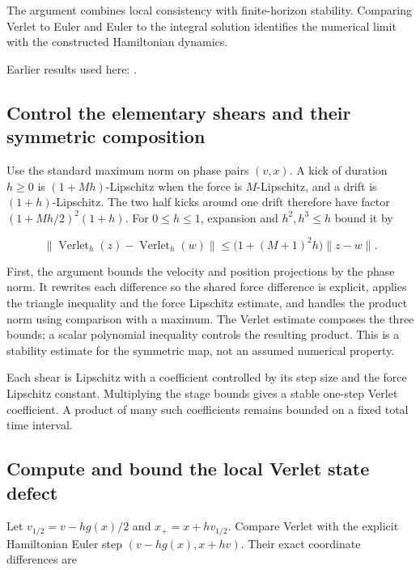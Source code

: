 \documentclass[11pt,a4paper]{report}
\begin{document}
The argument combines local consistency with finite-horizon stability. Comparing Verlet to Euler and Euler to the integral solution identifies the numerical limit with the constructed Hamiltonian dynamics.



Earlier results used here: \cite[Section~3.16]{LangevinLean2026ULASC}.
\subsection{\texorpdfstring{Control the elementary shears and their symmetric composition}{Control the elementary shears and their symmetric composition}}
\label{report-step-KineticLangevin-HamiltonianConvergence-lean-1}


Use the standard maximum norm on phase pairs \((v,x)\). A kick of duration \(h\ge0\) is \((1+Mh)\)-Lipschitz when the force is \(M\)-Lipschitz, and a drift is \((1+h)\)-Lipschitz. The two half kicks around one drift therefore have factor \((1+Mh/2)^2(1+h)\). For \(0\le h\le1\), expansion and \(h^2,h^3\le h\) bound it by

\[\|\operatorname{Verlet}_h(z)-\operatorname{Verlet}_h(w)\|\le\bigl(1+(M+1)^2h\bigr)\|z-w\|.\]

First, the argument bounds the velocity and position projections by the phase norm. It rewrites each difference so the shared force difference is explicit, applies the triangle inequality and the force Lipschitz estimate, and handles the product norm using comparison with a maximum. The Verlet estimate composes the three bounds; a scalar polynomial inequality controls the resulting product. This is a stability estimate for the symmetric map, not an assumed numerical property.



Each shear is Lipschitz with a coefficient controlled by its step size and the force Lipschitz constant. Multiplying the stage bounds gives a stable one-step Verlet coefficient. A product of many such coefficients remains bounded on a fixed total time interval.

\subsection{\texorpdfstring{Compute and bound the local Verlet state defect}{Compute and bound the local Verlet state defect}}
\label{report-step-KineticLangevin-HamiltonianConvergence-lean-2}


Let \(v_{1/2}=v-hg(x)/2\) and \(x_+=x+hv_{1/2}\). Compare Verlet with the explicit Hamiltonian Euler step \((v-hg(x),x+hv)\). Their exact coordinate differences are
\end{document}
